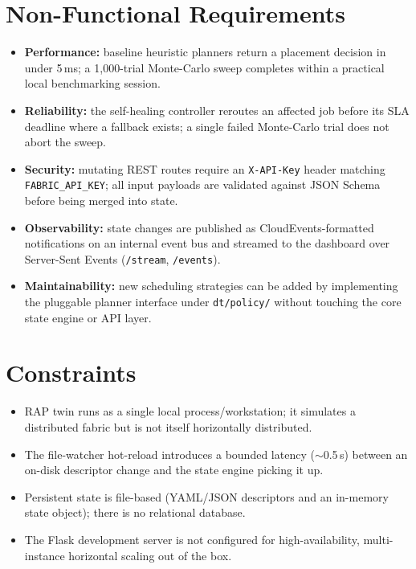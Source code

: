 \documentclass[12pt,a4]{report}
\begin{document}
\section{Non-Functional Requirements}

\begin{itemize}
    \item \textbf{Performance:} baseline heuristic planners return a placement decision in under 5\,ms; a 1,000-trial Monte-Carlo sweep completes within a practical local benchmarking session.
    \item \textbf{Reliability:} the self-healing controller reroutes an affected job before its SLA deadline where a fallback exists; a single failed Monte-Carlo trial does not abort the sweep.
    \item \textbf{Security:} mutating REST routes require an \texttt{X-API-Key} header matching \texttt{FABRIC\_API\_KEY}; all input payloads are validated against JSON Schema before being merged into state.
    \item \textbf{Observability:} state changes are published as CloudEvents-formatted notifications on an internal event bus and streamed to the dashboard over Server-Sent Events (\texttt{/stream}, \texttt{/events}).
    \item \textbf{Maintainability:} new scheduling strategies can be added by implementing the pluggable planner interface under \texttt{dt/policy/} without touching the core state engine or API layer.
\end{itemize}

\section{Constraints}
\label{sec:constraints-design}

\begin{itemize}
    \item RAP twin runs as a single local process/workstation; it simulates a distributed fabric but is not itself horizontally distributed.
    \item The file-watcher hot-reload introduces a bounded latency ($\sim$0.5\,s) between an on-disk descriptor change and the state engine picking it up.
    \item Persistent state is file-based (YAML/JSON descriptors and an in-memory state object); there is no relational database.
    \item The Flask development server is not configured for high-availability, multi-instance horizontal scaling out of the box.
\end{itemize}
\end{document}
